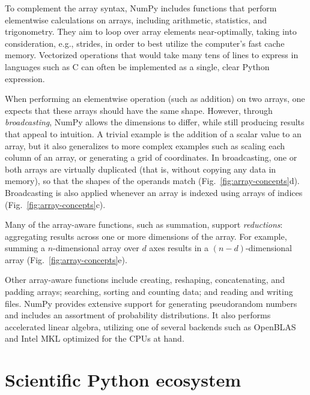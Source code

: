 To complement the array syntax, NumPy includes functions that perform
elementwise calculations on arrays, including arithmetic, statistics, and
trigonometry.
They aim to loop over array elements near-optimally, taking into consideration,
e.g., strides, in order to best utilize the computer's fast cache memory.
Vectorized operations that would take many tens of lines to express in
languages such as C can often be implemented as a single, clear Python
expression.

When performing an elementwise operation (such as addition) on two arrays, one
expects that these arrays should have the same shape.
However, through \emph{broadcasting}, NumPy allows the dimensions to differ, while
still producing results that appeal to intuition.
A trivial example is the addition of a scalar value to an array, but it also
generalizes to more complex examples such as scaling each column of an array,
or generating a grid of coordinates.
In broadcasting, one or both arrays are virtually duplicated (that is, without
copying any data in memory), so that the shapes of the operands match
(Fig.~\ref{fig:array-concepts}d).
Broadcasting is also applied whenever an array is indexed using arrays of
indices (Fig.~\ref{fig:array-concepts}c).

Many of the array-aware functions, such as summation, support \emph{reductions}: aggregating
results across one or more dimensions of the array.
For example, summing a $n$-dimensional array over $d$ axes results in a
$(n-d)$-dimensional array (Fig.~\ref{fig:array-concepts}e).

Other array-aware functions include creating, reshaping, concatenating, and padding
arrays; searching, sorting and counting data; and reading and writing files.
NumPy provides extensive support for generating pseudorandom numbers and
includes an assortment of probability distributions.
It also performs accelerated linear algebra, utilizing one of several backends
such as OpenBLAS \cite{wang2013augem,xianyi2012model} and Intel MKL optimized for the CPUs at hand.


\section*{Scientific Python ecosystem}



